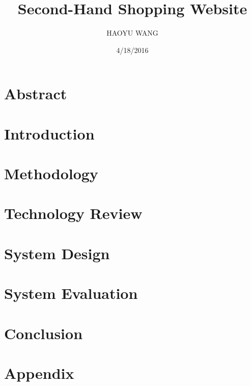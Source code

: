 \documentclass[12pt,twoside]{report}
\title{Second-Hand Shopping Website}
\author{HAOYU WANG}
\date{4/18/2016}
\begin{document}
	
		
	\tableofcontents
	
	\chapter{Abstract}
	
	
	\chapter{Introduction}
	
	
	\chapter{Methodology}
	
	
	\chapter{Technology Review}
	

	\chapter{System Design}
	
	
	\chapter{System Evaluation}		
	
		
	\chapter{Conclusion}
	
		
	\appendix
	\chapter{Appendix}
	
   
\printbibliography
	
\end{document}
